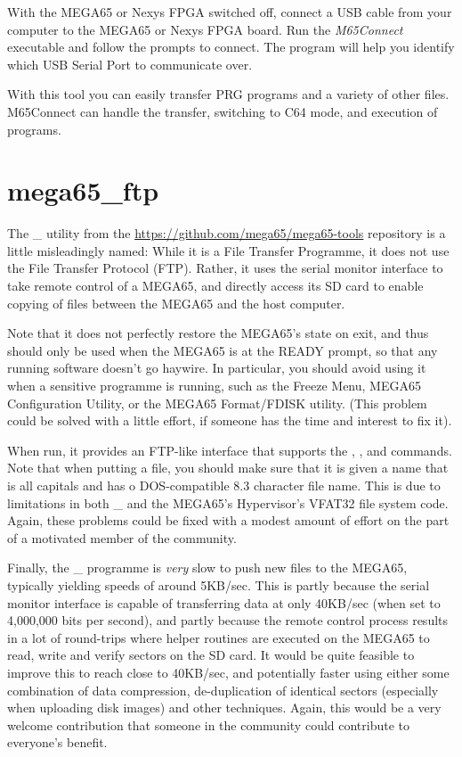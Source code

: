 With the MEGA65 or Nexys FPGA switched off, connect a USB cable from your computer to the MEGA65 or Nexys FPGA board. Run the \textit{M65Connect} executable and follow the prompts to connect. The program will help you identify which USB Serial Port to communicate over.

With this tool you can easily transfer PRG programs and a variety of other files. M65Connect can handle the transfer, switching to C64 mode, and execution of programs.

\section{mega65\_ftp}

The \_ utility from
the \url{https://github.com/mega65/mega65-tools} repository is a
little misleadingly named: While it 
is a File Transfer Programme, it does not use the File Transfer
Protocol (FTP).  Rather, it uses the serial monitor interface to take
remote control of a MEGA65, and directly access its SD card to enable
copying of files between the MEGA65 and the host computer.

Note that it does not perfectly restore the MEGA65's state on exit,
and thus should only be used when the MEGA65 is at the READY prompt,
so that any running software doesn't go haywire. In particular, you
should avoid using it when a sensitive programme is running, such as
the Freeze Menu, MEGA65 Configuration Utility, or the MEGA65
Format/FDISK utility.  (This problem could be solved with a little
effort, if someone has the time and interest to fix it).

When run, it provides an FTP-like interface that supports
the , ,  and  commands.
Note that when putting a file, you should make sure that it is given a
name that is all capitals and has o DOS-compatible 8.3 character file
name.  This is due to limitations in both \_ and the
MEGA65's Hypervisor's VFAT32 file system code. Again, these problems
could be fixed with a modest amount of effort on the part of a
motivated member of the community.

Finally, the \_ programme is {\em very} slow to push
new files to the MEGA65, typically yielding speeds of around 5KB/sec.
This is partly because the serial monitor interface is capable of
transferring data at only 40KB/sec (when set to 4,000,000 bits per
second), and partly because the remote control process results in a
lot of round-trips where helper routines are executed on the MEGA65 to
read, write and verify sectors on the SD card.  It would be quite
feasible to improve this to reach close to 40KB/sec, and potentially
faster using either some combination of data compression,
de-duplication of identical sectors (especially when uploading disk
images) and other techniques. Again, this would be a very welcome
contribution that someone in the community could contribute to
everyone's benefit.

